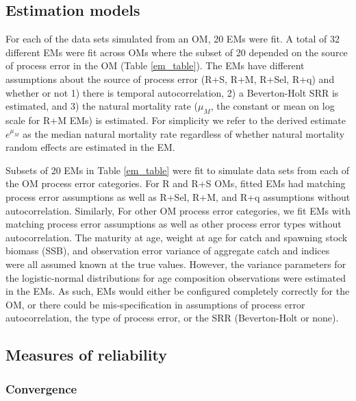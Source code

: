 \documentclass[
  12pt,
]{article}
\begin{document}
\subsection*{Estimation models}\label{estimation-models}

For each of the data sets simulated from an OM, 20 EMs were fit. A total
of 32 different EMs were fit across OMs where the subset of 20 depended
on the source of process error in the OM (Table \ref{em_table}). The EMs
have different assumptions about the source of process error (R+S, R+M,
R+Sel, R+q) and whether or not 1) there is temporal autocorrelation, 2)
a Beverton-Holt SRR is estimated, and 3) the natural mortality rate
(\(\mu_M\), the constant or mean on log scale for R+M EMs) is estimated.
For simplicity we refer to the derived estimate \(e^{\mu_M}\) as the
median natural mortality rate regardless of whether natural mortality
random effects are estimated in the EM.

Subsets of 20 EMs in Table \ref{em_table} were fit to simulate data sets
from each of the OM process error categories. For R and R+S OMs, fitted
EMs had matching process error assumptions as well as R+Sel, R+M, and
R+q assumptions without autocorrelation. Similarly, For other OM process
error categories, we fit EMs with matching process error assumptions as
well as other process error types without autocorrelation. The maturity
at age, weight at age for catch and spawning stock biomass (SSB), and
observation error variance of aggregate catch and indices were all
assumed known at the true values. However, the variance parameters for
the logistic-normal distributions for age composition observations were
estimated in the EMs. As such, EMs would either be configured completely
correctly for the OM, or there could be mis-specification in assumptions
of process error autocorrelation, the type of process error, or the SRR
(Beverton-Holt or none).

\subsection*{Measures of reliability}\label{measures-of-reliability}

\subsubsection*{Convergence}\label{convergence}
\end{document}
